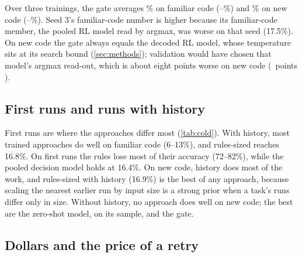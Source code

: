 \begin{table}[tbp]
\centering\small
\caption{Gate signals for seed 1. AUROC measures how well each signal ranks unseen pods above validation pods. The
middle columns give the share of pods routed to the RL model, and the last two the gate's regret on Job pods. All
gates use the 0.95 quantile except the disagreement gate, shown at 0.5.}
\label{tab:gate}

\end{table}

Over three trainings, the gate averages \mTestGate\% on familiar code (\loTestGate--\hiTestGate\%) and
\mUnseenGate\% on new code (\loUnseenGate--\hiUnseenGate\%). Seed 3's familiar-code number is higher because its
familiar-code member, the pooled RL model read by argmax, was worse on that seed (17.5\%). On new code the gate always
equals the decoded RL model, whose temperature sits at its search bound (\cref{sec:methods}); validation would have
chosen that model's argmax read-out, which is about eight points worse on new code (\diffUnseenRLArgRL\ points
\diffUnseenRLArgRLCI).

\subsection{First runs and runs with history}
\label{sec:res-cold}

First runs are where the approaches differ most (\cref{tab:cold}). With history, most trained approaches do well on
familiar code (6--13\%), and rules-sized reaches 16.8\%. On first runs the rules lose most of their accuracy
(72--82\%), while the pooled decision model holds at 16.4\%. On new code, history does most of the work, and
rules-sized with history (16.9\%) is the best of any approach, because scaling the nearest earlier run by input size is a strong prior when a task's runs
differ only in size. Without history, no approach does well on new code; the best are the zero-shot model, on its
sample, and the gate.

\begin{table}[tbp]
\centering\small
\caption{Job regret (\%) on first runs and on runs with history, for seed 1.}
\label{tab:cold}

\end{table}

\subsection{Dollars and the price of a retry}
\label{sec:res-sens}

